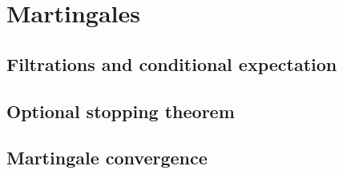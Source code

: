 
\section{Martingales}

\subsection{Filtrations and conditional expectation}


\subsection{Optional stopping theorem}


\subsection{Martingale convergence}

